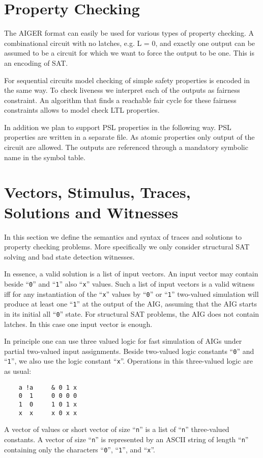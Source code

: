 \documentclass[10pt]{llncs}
\begin{document}
\section{Property Checking}
  
  The AIGER format can easily be used for various types of property
  checking.  A combinational circuit with no latches, e.g. L = 0, and
  exactly one output can be assumed to be a circuit for which we want to
  force the output to be one.  This is an encoding of SAT.

  For sequential circuits model checking of simple safety properties is
  encoded in the same way.  To check liveness we interpret each of the
  outputs as fairness constraint.  An algorithm that finds a reachable fair
  cycle for these fairness constraints allows to model check LTL properties.

  In addition we plan to support PSL properties in the following way.
  PSL properties are written in a separate file.  As atomic properties
  only output of the circuit are allowed.  The outputs are referenced
  through a mandatory symbolic name in the symbol table.

\section{Vectors, Stimulus, Traces, Solutions and Witnesses}

  In this section we define the semantics and syntax of traces and solutions
  to property checking problems.  More specifically we only consider
  structural SAT solving and bad state detection witnesses.
  
  In essence, a valid solution is a list of input vectors. An input vector
  may contain beside ``\texttt{0}'' and ``\texttt{1}'' also ``\texttt{x}'' values.  Such a list of input
  vectors is a valid witness iff for any instantiation of the ``\texttt{x}'' values by
  ``\texttt{0}'' or ``\texttt{1}'' two-valued simulation will produce at least one
  ``\texttt{1}'' at the
  output of the AIG, assuming that the AIG starts in its initial all ``\texttt{0}''
  state.  For structural SAT problems, the AIG does not contain latches.
  In this case one input vector is enough.

  In principle one can use three valued logic for fast simulation of AIGs
  under partial two-valued input assignments.  Beside two-valued logic
  constants ``\texttt{0}'' and ``\texttt{1}'', we also use the logic constant
  ``\texttt{x}''.  Operations in
  this three-valued logic are as usual:
\begin{verbatim}
    a !a     & 0 1 x
    0  1     0 0 0 0
    1  0     1 0 1 x
    x  x     x 0 x x
\end{verbatim}
  A vector of values or short vector of size ``\texttt{n}'' is a list of
  ``\texttt{n}''
  three-valued constants.  A vector of size ``\texttt{n}'' is represented by
  an ASCII string of length ``\texttt{n}'' containing only the characters
  ``\texttt{0}'',
  ``\texttt{1}'', and ``\texttt{x}''.
\end{document}
